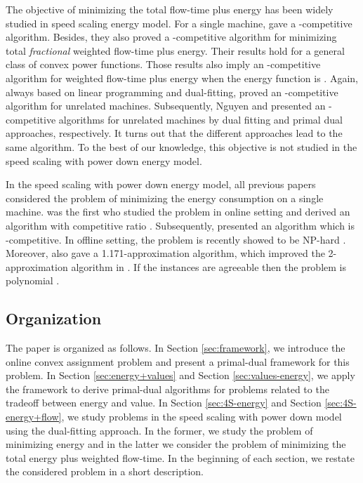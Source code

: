 \documentclass[11pt]{article}
\begin{document}
The objective of minimizing the total flow-time plus energy has been widely studied in speed scaling energy model. 
For a single machine, \citet{BansalChan09:Speed-scaling}
gave a -competitive algorithm. Besides, they also proved a  
-competitive algorithm for minimizing total \emph{fractional} weighted flow-time plus
energy. Their results hold for a general class of convex power functions. Those results also 
imply an -competitive algorithm for weighted flow-time plus energy 
when the energy function is . Again, always based on linear programming and dual-fitting, 
\citet{AnandGarg12:Resource-augmentation} proved an -competitive algorithm 
for unrelated machines. Subsequently, Nguyen \cite{Thang13:Lagrangian-Duality} and
\citet{DevanurHuang14:Primal-Dual} presented an -competitive algorithms 
for unrelated machines by dual fitting and primal dual approaches, respectively. It turns out that the different
approaches lead to the same algorithm. To the best of our knowledge, this objective is not studied 
in the speed scaling with power down energy model.

In the speed scaling with power down energy model, all previous papers
considered the problem of minimizing the energy consumption on a single machine. 
\citet{IraniShukla07:Algorithms-for-power} was the first 
who studied the problem in online setting and derived an algorithm with competitive ratio 
. Subsequently, 
\citet{HanLam10:Deadline-scheduling} presented an algorithm 
which is -competitive.
In offline setting, the problem is recently showed to be NP-hard 
\cite{AlbersAntoniadis12:Race-to-idle:}. Moreover, \citet{AlbersAntoniadis12:Race-to-idle:}
also gave a 1.171-approximation algorithm, which improved
the 2-approximation algorithm in \cite{IraniShukla07:Algorithms-for-power}. 
If the instances are agreeable then the problem is polynomial 
\cite{BampisDurr12:Speed-scaling}.
 
 
 
\subsection{Organization}
The paper is organized as follows. In Section \ref{sec:framework}, we introduce the 
online convex assignment problem and present a primal-dual framework for this problem.
In Section \ref{sec:energy+values} and Section \ref{sec:values-energy}, we apply the framework
to derive primal-dual algorithms for problems related to the tradeoff between energy and value. 
In Section \ref{sec:4S-energy} and Section \ref{sec:4S-energy+flow}, we study problems
in the speed scaling with power down model using the dual-fitting approach.  
In the former, we study the problem of minimizing energy and 
in the latter we consider the problem of minimizing 
the total energy plus weighted flow-time. In the beginning of each section, we 
restate the considered problem in a short description. 
\end{document}
